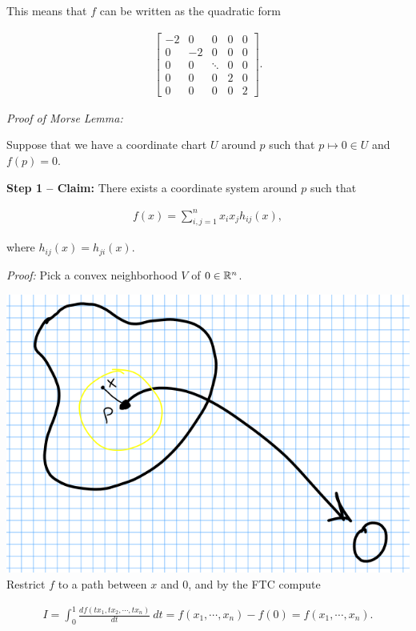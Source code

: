 This means that \(f\) can be written as the quadratic form

\begin{align*}
\left[\begin{array}{ccccc}
-2  & 0  & 0       & 0    & 0 \\
0   & -2 & 0       & 0    & 0 \\
0   & 0  & \ddots  &  0   & 0 \\
0   & 0  & 0       &  2   & 0 \\
0   & 0  & 0       &  0   & 2
\end{array}\right]
.\end{align*}

\emph{Proof of Morse Lemma:}

Suppose that we have a coordinate chart \(U\) around \(p\) such that
\(p\mapsto 0\in U\) and \(f(p) = 0\).

\textbf{Step 1 -- Claim:} There exists a coordinate system around \(p\)
such that

\begin{align*}
f(x) = \sum_{i,j=1}^n x_i x_j h_{ij}(x)
,\end{align*}

where \(h_{ij}(x) = h_{ji}(x)\).

\emph{Proof:} Pick a convex neighborhood \(V\) of \(0\in \mathbb{R}^n\).

\includegraphics{figures/2020-01-09-11:38.png}\\

Restrict \(f\) to a path between \(x\) and \(0\), and by the FTC compute

\begin{align*}
I = \int_0^1 \frac{df(tx_1, tx_2, \cdots, tx_n) }{dt}  ~dt = f(x_1, \cdots, x_n) - f(0) = f(x_1, \cdots, x_n)
.\end{align*}

